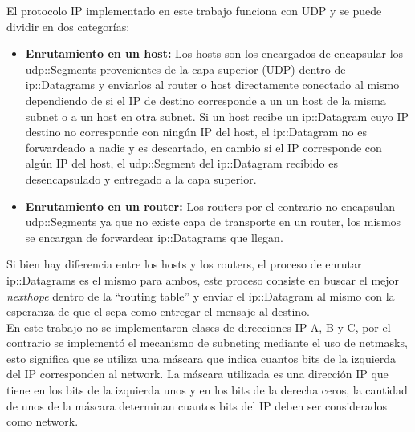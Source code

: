 \documentclass[10pt,a4paper]{article}
\begin{document}
El protocolo IP implementado en este trabajo funciona con UDP y se puede dividir en dos categorías:
\begin{itemize}
\item \textbf{Enrutamiento en un host:} Los hosts son los encargados de encapsular los udp::Segments provenientes de la capa superior (UDP) dentro de ip::Datagrams y enviarlos al router o host directamente conectado al mismo dependiendo de si el IP de destino corresponde a un un host de la misma subnet o a un host en otra subnet. Si un host recibe un ip::Datagram cuyo IP destino no corresponde con ningún IP del host, el ip::Datagram no es forwardeado a nadie y es descartado, en cambio si el IP corresponde con algún IP del host, el udp::Segment del ip::Datagram recibido es desencapsulado y entregado a la capa superior.
\item \textbf{Enrutamiento en un router:} Los routers por el contrario no encapsulan udp::Segments ya que no existe capa de transporte en un router, los mismos se encargan de forwardear ip::Datagrams que llegan.
\end{itemize}

Si bien hay diferencia entre los hosts y los routers, el proceso de enrutar ip::Datagrams es el mismo para ambos, este proceso consiste en buscar el mejor \textit{nexthope} dentro de la ``routing table'' y enviar el ip::Datagram al mismo con la esperanza de que el sepa como entregar el mensaje al destino. \\

En este trabajo no se implementaron clases de direcciones IP A, B y C, por el contrario se implementó el mecanismo de subneting mediante el uso de netmasks, esto significa que se utiliza una máscara que indica cuantos bits de la izquierda del IP corresponden al network. La máscara utilizada es una dirección IP que tiene en los bits de la izquierda unos y en los bits de la derecha ceros, la cantidad de unos de la máscara determinan cuantos bits del IP deben ser considerados como network. \\
\end{document}
